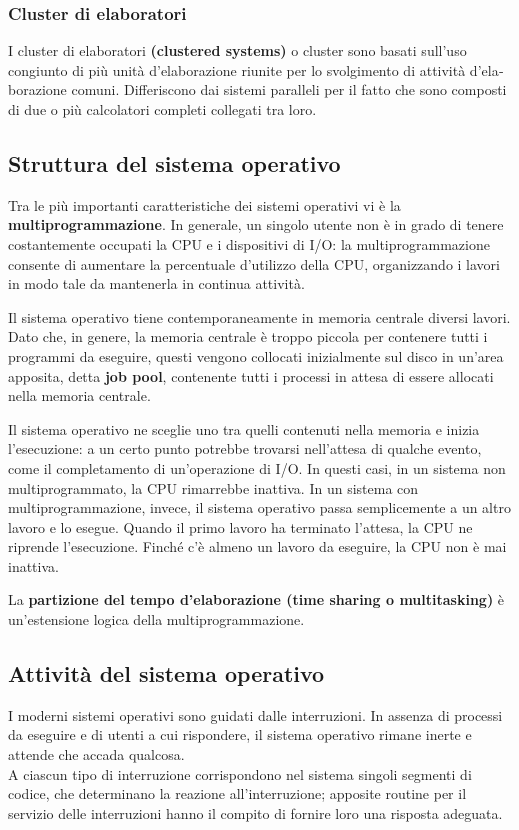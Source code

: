 \documentclass[11pt,a4paper]{article}
\begin{document}
\subsubsection{Cluster di elaboratori}
I cluster di elaboratori \textbf{(clustered systems)} o cluster sono ba­sati sull'uso congiunto di più unità d'elaborazione riunite per lo svolgimento di attività d'ela­borazione comuni. Differiscono dai sistemi paralleli per il fatto che sono composti di due o
più calcolatori completi collegati tra loro.

\subsection{Struttura del sistema operativo}
Tra le più importanti caratteristiche dei sistemi operativi vi è la \textbf{multiprogrammazione}. In
generale, un singolo utente non è in grado di tenere costantemente occupati la CPU e i di­spositivi di I/O: la multiprogrammazione consente di aumentare la percentuale d'utilizzo
della CPU, organizzando i lavori in modo tale da mantenerla in continua attività.

Il sistema operativo tiene contem­poraneamente in memoria centrale diversi lavori. Dato che, in genere, la me­moria centrale è troppo piccola per contenere tutti i programmi da eseguire, questi vengono
collocati inizialmente sul disco in un'area apposita, detta \textbf{job pool}, contenente tutti i pro­cessi in attesa di essere allocati nella memoria centrale.

Il sistema operativo ne sceglie uno tra quelli contenuti nella me­moria e inizia l'esecuzione: a un certo punto potrebbe trovarsi nell'attesa di qualche evento,
come il completamento di un'operazione di I/O. In questi casi, in un sistema non multiprogrammato, la CPU rimarrebbe inattiva. In un sistema con multiprogrammazione, invece, il
sistema operativo passa semplicemente a un altro lavoro e lo esegue. Quando il primo lavo­ro ha terminato l'attesa, la CPU ne riprende l'esecuzione. Finché c'è almeno un lavoro da
eseguire, la CPU non è mai inattiva.

La \textbf{partizione del tempo d'ela­borazione (time sharing o multitasking)} è un'estensione logica della multiprogrammazione.

\subsection{Attività del sistema operativo}
I moderni sistemi operativi sono guidati dalle interru­zioni. In assenza di processi da
eseguire e di utenti a cui rispondere, il sistema operativo rimane inerte e attende che accada
qualcosa.\\
A ciascun tipo di interruzione corrispondono nel sistema
singoli segmenti di codice, che determinano la reazione all'interruzione; apposite routine per
il servizio delle interruzioni hanno il compito di fornire loro una risposta adeguata.
\end{document}
